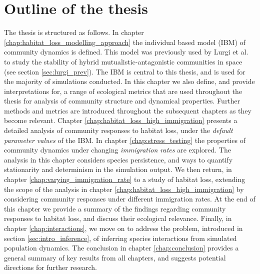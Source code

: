 


\section{Outline of the thesis}
\label{sec:intro_outline}

The thesis is structured as follows. In chapter \ref{chap:habitat_loss_modelling_approach} the individual based model (IBM) of community dynamics is defined. This model was previously used by Lurgi et al. \cite{lurgi2015effects} to study the stability of hybrid mutualistic-antagonistic communities in space (see section \ref{sec:lurgi_prev}). The IBM is central to this thesis, and is used for the majority of simulations conducted. In this chapter we also define, and provide interpretations for, a range of ecological metrics that are used throughout the thesis for analysis of community structure and dynamical properties. Further methods and metrics are introduced throughout the subsequent chapters as they become relevant. Chapter \ref{chap:habitat_loss_high_immigration} presents a detailed analysis of community responses to habitat loss, under the \emph{default parameter values} of the IBM. In chapter \ref{chap:stress_testing} the properties of community dynamics under changing \emph{immigration rates} are explored. The analysis in this chapter considers species persistence, and ways to quantify stationarity and determinism in the simulation output. We then return, in chapter \ref{chap:varying_immigration_rate} to a study of habitat loss, extending the scope of the analysis in chapter \ref{chap:habitat_loss_high_immigration} by considering community responses under different immigration rates. At the end of this chapter we provide a summary of the findings regarding community responses to habitat loss, and discuss their ecological relevance. Finally, in chapter \ref{chap:interactions}, we move on to address the problem, introduced in section \ref{sec:intro_inference}, of inferring species interactions from simulated population dynamics. The conclusion in chapter \ref{chap:conclusion} provides a general summary of key results from all chapters, and suggests potential directions for further research.

